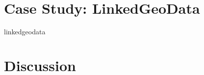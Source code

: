 \section{Case Study: LinkedGeoData}
{
\let\section\subsection
\let\subsection\subsubsection
{linkedgeodata}
}

\section{Discussion}


